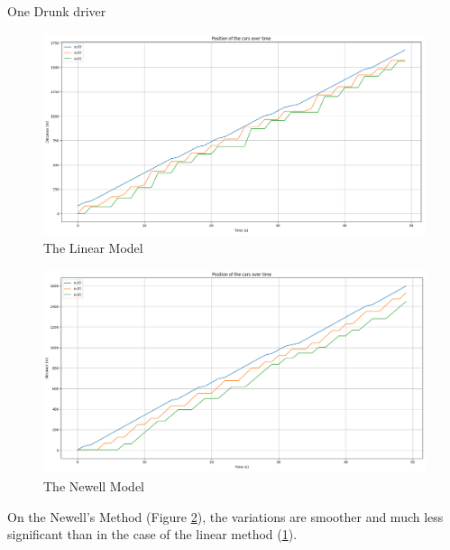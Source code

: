 \documentclass{beamer}
\begin{document}
\begin{frame}{One Drunk driver}
	\begin{minipage}{0.49\textwidth}
		\centering
		\begin{figure}
			\includegraphics[width=1.1\textwidth]{Model1W3C_O_Aco_D2_Linear.png}
			\caption{The Linear Model}
			\label{fig:DL}
		\end{figure}
	\end{minipage}\hfill
	\begin{minipage}{0.49\textwidth}
		\centering
		\begin{figure}
			\includegraphics[width=1.1\textwidth]{Model1W3C_O_Aco_D2_Newell.png}
			\caption{The Newell Model}
			\label{fig:DN}
		\end{figure}
	\end{minipage}
	\begin{block}{}
		On the Newell's Method (Figure \ref{fig:DN}), the variations are smoother and much less significant than in the case of the linear method (\ref{fig:DL}).
	\end{block}
\end{frame}
\end{document}

